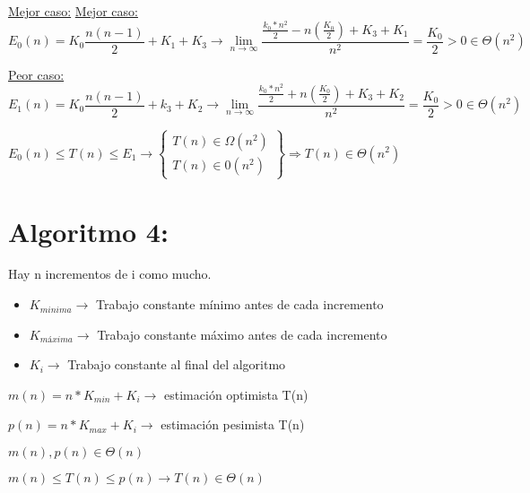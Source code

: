 \documentclass{article}
\begin{document}
\underline{Mejor caso:}
\underline{Mejor caso:}
\[
    E_{0}(n) = K_{0}\frac{n(n-1)}{2} + K_{1} + K_{3} \rightarrow \lim_{n \rightarrow \infty} \frac{\frac{k_{0}*n^{2}}{2} - n(\frac{K_{0}}{2})+ K_{3} + K_{1}}{n^{2}} = \frac{K_{0}}{2} > 0 \in \Theta (n^{2})
\]

\underline{Peor caso: }
\[
    E_{1}(n) = K_{0}\frac{n(n-1)}{2} + k_{3} + K_{2} \rightarrow \lim_{n \rightarrow \infty} \frac{\frac{k_{0}*n^{2}}{2} + n(\frac{K_{0}}{2})+ K_{3} + K_{2}}{n^{2}} = \frac{K_{0}}{2} > 0 \in \Theta (n^{2})
\]

$E_{0}(n) \leq T(n) \leq E_{1} \rightarrow \left\{\begin{array}{l}
        T(n) \in \Omega(n^2) \\
        T(n) \in 0(n^2)
    \end{array}\right\} \Rightarrow T(n) \in \Theta (n^2)$

\section*{Algoritmo 4:}
\begin{figure}[H]
    \centering
    
\end{figure}

Hay n incrementos de i como mucho.
\begin{itemize}
    \item $K_{minima} \rightarrow$ Trabajo constante mínimo antes de cada incremento
    \item $K_{máxima} \rightarrow$ Trabajo constante máximo antes de cada incremento
    \item $K_{i} \rightarrow$ Trabajo constante al final del algoritmo
\end{itemize}

$m(n) = n*K_{min} + K_{i} \rightarrow$ estimación optimista T(n)

$p(n) = n*K_{max} + K_{i} \rightarrow$ estimación pesimista T(n)

$m(n), p(n) \in \Theta(n)$

$m(n) \leq T(n) \leq p(n) \rightarrow T(n) \in \Theta (n)$
\end{document}
